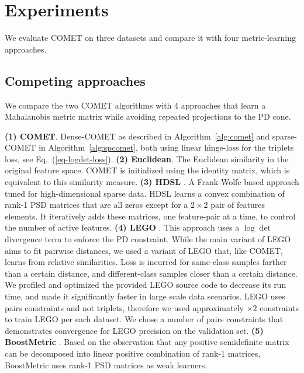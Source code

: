 \documentclass[twoside,11pt]{article}
\renewcommand{\eqref}[1]{Eq.~(\ref{#1})}
\begin{document}

\vspace{-6pt}
\section{Experiments}\vskip -5pt
We evaluate COMET on three datasets and compare it with four metric-learning approaches. 

\vspace{-6pt}
\subsection{Competing approaches}\vskip -5pt
We compare the two COMET algorithms with 4 approaches that learn a Mahalanobis metric matrix while avoiding repeated projections to the PD cone.

\noindent \textbf{(1) COMET}. Dense-COMET as described in Algorithm~\ref{alg:comet} and sparse-COMET  in Algorithm~\ref{alg:spcomet}, both using linear hinge-loss for the triplets loss, see \eqref{eq-logdet-loss}. \textbf{(2) Euclidean}. The Euclidean similarity in the original feature space. COMET is initialized using the identity matrix, which is equivalent to this similarity measure.  \textbf{(3) HDSL} \citep{HDSL}. A Frank-Wolfe based approach tuned for high-dimensional sparse data. HDSL learns a convex combination of rank-1 PSD matrices that are all zeros except for a $2\times2$ pair of features elements. It iteratively adds these matrices, one feature-pair at a time, to control the number of active features. \textbf{(4) LEGO} \citep{lego}. This approach uses a $\log \det$ divergence term to enforce the PD constraint. While the main variant of LEGO aims to fit pairwise distances, we used a variant of LEGO that, like COMET, learns from relative similarities. Loss is incurred for same-class samples farther than a certain distance, and different-class samples closer than a certain distance. We profiled and optimized the provided LEGO source code to decrease its run time, and made it significantly faster in large scale data scenarios. LEGO uses pairs constraints and not triplets, therefore we used approximately $\times2$ constraints to train LEGO per each dataset. We chose a number of pairs constraints that demonstrates convergence for LEGO precision on the validation set. \textbf{(5) BoostMetric} \citep{boost}. Based on the observation that any positive semidefinite matrix can be decomposed into linear positive combination of rank-1 matrices, BoostMetric uses rank-1 PSD matrices as weak learners.
\end{document}
